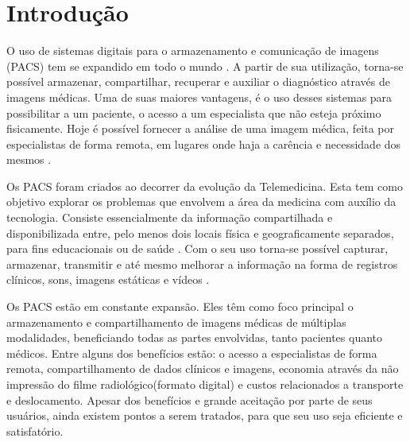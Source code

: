\section{\esp Introdução}

O uso de sistemas digitais para o armazenamento e comunicação de imagens (PACS) tem se expandido em todo o mundo \cite{REF19}.
A partir de sua utilização, torna-se possível armazenar, compartilhar, recuperar e auxiliar o diagnóstico através de imagens médicas. 
Uma de suas maiores vantagens, é o uso desses sistemas para possibilitar a um paciente, o acesso a um especialista que não esteja próximo fisicamente. 
Hoje é possível fornecer a análise de uma imagem médica, feita por especialistas de forma remota, em lugares onde haja a carência e necessidade dos mesmos \cite{REF01} \cite{REF04}.

Os PACS foram criados ao decorrer da evolução da Telemedicina. 
Esta tem como objetivo explorar os problemas que envolvem a área da medicina com auxílio da tecnologia.
Consiste essencialmente da informação compartilhada e disponibilizada entre, pelo menos dois locais física e geograficamente separados, para fins educacionais ou de saúde \cite{REF01}. 
Com o seu uso torna-se possível capturar, armazenar, transmitir e até mesmo melhorar a informação na forma de registros clínicos, sons, imagens estáticas e vídeos \cite{REF12}.

Os PACS estão em constante expansão. Eles têm como foco principal o armazenamento e compartilhamento de imagens médicas de múltiplas modalidades, beneficiando todas as partes envolvidas, tanto pacientes quanto médicos.
Entre alguns dos benefícios estão: o acesso a especialistas de forma remota, compartilhamento de dados clínicos e imagens, economia através da não impressão do filme radiológico(formato digital) e custos relacionados a transporte e deslocamento.
Apesar dos benefícios e grande aceitação por parte de seus usuários, ainda existem pontos a serem tratados, para que seu uso seja eficiente e satisfatório.

